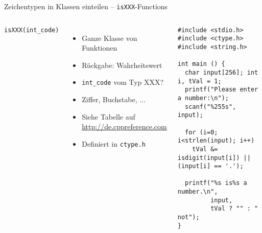 \begin{frame}[fragile]{Zeichentypen in Klassen einteilen -- \texttt{isXXX}-Functions}
%
\begin{columns}[T]
\begin{codebox}[Syntax]
\texttt{isXXX(int\_code)}
\end{codebox}
\begin{itemize}
\item Ganze Klasse von Funktionen
\item Rückgabe: Wahrheitswert
\item \texttt{int\_code} vom Typ XXX?
\item Ziffer, Buchstabe, ...
\item Siehe Tabelle auf\newline
	{\footnotesize\url{http://de.cppreference.com}}
\item Definiert in \texttt{ctype.h}
\end{itemize}
%
\begin{codebox}
\begin{verbatim}
#include <stdio.h>
#include <ctype.h>
#include <string.h>

int main () {
  char input[256]; int i, tVal = 1;
  printf("Please enter a number:\n");
  scanf("%255s", input);
	
  for (i=0; i<strlen(input); i++)
    tVal &= isdigit(input[i]) || (input[i] == '.');
	
  printf("%s is%s a number.\n", 
         input, 
         tVal ? "" : " not");
}
\end{verbatim}
\end{codebox}
\end{columns}
%
\end{frame}


